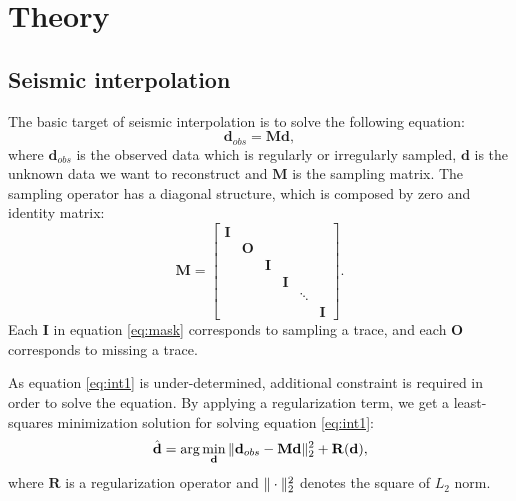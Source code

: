 \section{Theory}
\subsection{Seismic interpolation}
The basic target of seismic interpolation is to solve the following equation:
\begin{equation}
\label{eq:int1}
\mathbf{d}_{obs}=\mathbf{Md},
\end{equation}
where $\mathbf{d}_{obs}$ is the observed data which is regularly or irregularly sampled, $\mathbf{d}$ is the unknown data we want to reconstruct and $\mathbf{M}$ is the sampling matrix. The sampling operator has a diagonal structure, which is composed by zero and identity matrix:
\begin{equation}
\label{eq:mask}
\mathbf{M} = \left[\begin{array}{cccccccc} 
\mathbf{I} & 	       & 	  & 	     &		 &	\\
	   &\mathbf{O} & 	  &	     &		 &	\\
	   &           &\mathbf{I}&	     &		 &	\\
	   &  	       &          &\mathbf{I}&	         & 	\\
	   &	       &	  &	     &\mathbf{\ddots} & \\
	   &	       &	  &	     &		 & \mathbf{I} 
\end{array}\right].
\end{equation}
Each $\mathbf{I}$ in equation \ref{eq:mask} corresponds to sampling a trace, and each $\mathbf{O}$ corresponds to missing a trace.

As equation \ref{eq:int1} is under-determined, additional constraint is required in order to solve the equation. By applying a regularization term, we get a least-squares minimization solution for solving equation \ref{eq:int1}:
\begin{equation}
\label{eq:int2}
\hat{\mathbf{d}}=\arg\min_{\mathbf{d}}\Arrowvert \mathbf{d}_{obs}-\mathbf{Md}\Arrowvert_2^2+\mathbf{R}(\mathbf{d}),
\end{equation}
where $\mathbf{R}$ is a regularization operator and $\Arrowvert\cdot\Arrowvert_2^2$ denotes the square of $L_2$ norm.

